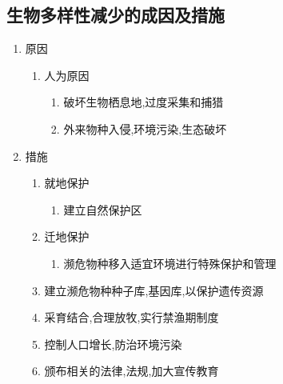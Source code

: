 \documentclass[a4paper]{article}
\begin{document}
    \subsection{生物多样性减少的成因及措施}
    \begin{enumerate}
        \item 原因
        \begin{enumerate}
            \item 人为原因
            \begin{enumerate}
                \item 破坏生物栖息地,过度采集和捕猎
                \item 外来物种入侵,环境污染,生态破坏
            \end{enumerate}
        \end{enumerate}
        \item 措施
        \begin{enumerate}
            \item 就地保护
            \begin{enumerate}
                \item 建立自然保护区
            \end{enumerate}
            \item 迁地保护
            \begin{enumerate}
                \item 濒危物种移入适宜环境进行特殊保护和管理
            \end{enumerate}
            \item 建立濒危物种种子库,基因库,以保护遗传资源
            \item 采育结合,合理放牧,实行禁渔期制度
            \item 控制人口增长,防治环境污染
            \item 颁布相关的法律,法规,加大宣传教育
        \end{enumerate}
    \end{enumerate}
\end{document}
